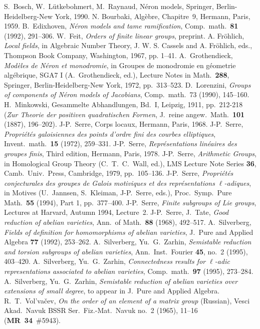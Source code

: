 \documentclass{amsart}
\theoremstyle{definition}
\begin{document}
\begin{thebibliography}{99}

 S.\ Bosch, W.\ L\"utkebohmert, M.\ Raynaud, N\'eron models,
Springer, Berlin-Heidelberg-New York, 1990.
 N. Bourbaki, Alg\`ebre, 
Chapitre~9, Hermann, Paris, 1959.
 B.\ Edixhoven, {\em N\'eron models and tame
ramification}, Comp.\ math.\ {\bf 81} (1992), 291--306.
 W.\ Feit, {\em Orders of finite linear groups}, preprint.
 A. Fr\"ohlich, {\em Local fields}, in Algebraic
Number Theory, J. W. S. Cassels and A. Fr\"ohlich, eds., Thompson
Book Company, Washington, 1967, pp. 1--41.
 A.\ Grothendieck, {\em Mod\`eles de N\'eron et monodromie},
in Groupes de monodromie en g\'eometrie alg\'ebrique, SGA7 I 
(A.\ Gro\-then\-dieck, ed.), Lecture Notes in Math.\ {\bf 288}, Springer,
Berlin-Heidelberg-New York, 1972, pp.\ 313--523.
 D.\ Lorenzini, {\em
Groups of components of N\'eron models of
Jacobians}, Comp.\ math.\ 73 (1990), 145--160.
 H.\ Minkowski, Gesammelte Abhandlungen, Bd.\ I, Leipzig, 
1911, pp.\ 212-218 ({\em Zur Theorie der positiven quadratischen Formen}, 
J.\ reine angew.\ Math.\ {\bf 101} (1887), 196--202).
 J-P.\ Serre, Corps locaux, Hermann, Paris, 1968.
 J-P.\ Serre, {\em Propri\'et\'es galoisiennes des
points d'ordre fini des courbes elliptiques}, Invent.\ math.\ {\bf 15}
(1972), 259--331.
 J-P.\ Serre, {\em Repr\'esentations
lin\'eaires des groupes finis}, Third edition, Hermann, Paris,
1978.
 J-P.\ Serre, {\em Arithmetic Groups},
in Homological Group Theory (C.\ T.\ C.\ Wall, ed.),
LMS Lecture Note Series {\bf 36}, Camb.\ Univ.\ Press,
Cambridge, 1979, pp.\ 105--136.
 J-P.\ Serre, {\em Propri\'et\'es conjecturales 
des groupes de Galois motiviques et des repr\'esentations $\ell$-adiques}, 
in Motives 
(U.\ Jannsen, S.\ Kleiman, J-P.\ Serre, eds.), Proc.\ Symp.\ Pure 
Math.\ {\bf 55} (1994), Part 1, pp.~377--400.
 J-P.\ Serre, {\em Finite subgroups of Lie 
groups}, Lectures at Harvard, Autumn 1994, Lecture~2. 
 J-P.\ Serre, J.\ Tate, {\em Good reduction of abelian 
varieties}, Ann.\ of Math.\ {\bf 88} (1968), 492--517. 
 A.\ Silverberg,  {\em Fields of definition for homomorphisms 
of abelian varieties}, J.\ Pure and Applied Algebra {\bf 77} (1992),
253--262.
 A.\ Silverberg, Yu.\ G.\ Zarhin, {\em Semistable reduction 
and torsion subgroups of abelian varieties}, 
Ann.\ Inst.\ Fourier {\bf 45}, no.~2 (1995), 403--420.
 A.\ Silverberg, Yu.\ G.\ Zarhin, {\em 
Connectedness results for $\ell$-adic 
representations associated to abelian varieties}, 
Comp.\ math.\ {\bf 97} (1995), 273--284.
 A.\ Silverberg, Yu.\ G.\ Zarhin, 
{\em Semistable reduction of abelian varieties over extensions
of small degree}, to appear in J.\ Pure and Applied Algebra.
 R.\ T.\ Vol'va\v{c}ev, {\em On the order of an element
of a matrix group} (Russian), Vesci Akad.\ Navuk BSSR Ser.\ Fiz.-Mat.\
Navuk no.\ 2 (1965), 11--16 ({\bf MR~34}~\#{5943}).
\end{thebibliography}
\end{document}
